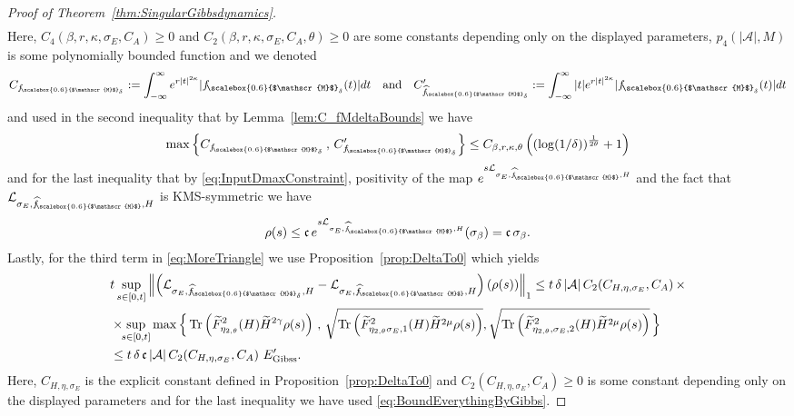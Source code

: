 \documentclass[11pt]{amsart}
\newcommand{\1}{\mathbbm{1}}
\newcommand{\Tr}{\operatorname{Tr}}
\newcommand{\cL}{\mathcal{L}}
\newcommand{\cA}{\mathcal{A}}
\newcommand{\hatfM}{\widehat{f}_{\!\scalebox{0.6}{$\mathscr{M}$}}
}
\newcommand{\hatfMdelta}{\widehat{f}_{\!\scalebox{0.6}{$\mathscr{M}$}_\delta}}
\newcommand{\fMdelta}{f_{\!\scalebox{0.6}{$\mathscr{M}$}_\delta}}
\theoremstyle{plain}
\theoremstyle{definition}
\theoremstyle{remark}
\numberwithin{equation}{section}
\begin{document}
\begin{proof}[Proof of Theorem~\ref{thm:SingularGibbsdynamics}]
\begin{align*}
\end{align*}
Here, $C_4(\beta,r,\kappa,\sigma_E,C_A)\ge 0$ and $C_2(\beta,r,\kappa,\sigma_E,C_A,\theta)\ge 0$ are some constants depending only on the displayed parameters, $p_4(|\mathcal{A}|,M)$ is some polynomially bounded function and we denoted
\begin{align*}
    C_{\fMdelta} := \int_{-\infty}^{\infty} e^{r|t|^{2\kappa}} |\fMdelta(t)| dt\quad\text{and}\quad C'_{\hatfMdelta} := \int_{-\infty}^{\infty} |t|e^{r|t|^{2\kappa}} |\fMdelta(t)| dt
\end{align*}
and used in the second inequality that by Lemma~\ref{lem:C_fMdeltaBounds} we have
\begin{align*}
    \max\left\{C_{\fMdelta}\,,\, C'_{\fMdelta}\right\}\le C_{\beta,r,\kappa,\theta}\left((\log(1/\delta))^{\frac{1}{2\theta}} +1\right)
\end{align*}
 and for the last inequality that by \eqref{eq:InputDmaxConstraint}, positivity of the map $e^{s\cL_{\sigma_E,\hatfM,H}}$ and the fact that $\cL_{\sigma_E,\hatfM,H}$ is KMS-symmetric we have
\begin{align}
\label{eq:BoundEverythingByGibbs}
   \rho(s) \le \mathfrak{c}\, e^{s\cL_{\sigma_E,\hatfM,H}}(\sigma_\beta ) = \mathfrak{c}\,\sigma_\beta. 
\end{align}
Lastly, for the third term in \eqref{eq:MoreTriangle} we use Proposition~\ref{prop:DeltaTo0} which yields
\begin{align*}
&t\sup_{s\in[0,t]}\left\|\left(\cL_{\sigma_E,\hatfMdelta,H}-\cL_{\sigma_E,\hatfM,H}\right)(\rho(s))\right\|_1 \le t\, \delta \,|\cA|\,C_2\!\left(C_{H,\eta,\sigma_E},C_A\right) \times\\&\times\!\!\sup_{s\in[0,t]}\max\Big\{\Tr\left( \widetilde F^2_{\eta_{2,\theta}}(H) \widetilde H^{2\gamma}\rho(s)\right)\,,\, \sqrt{\Tr\left(\widetilde F^2_{\eta_{2,\theta}\sigma_E,1}(H) \widetilde H^{2\mu}\rho(s)\right)}, \sqrt{\Tr\left(\widetilde F^2_{\eta_{2,\theta},\sigma_E,2}(H) \widetilde H^{2\mu}\rho(s)\right)}\,\Big\} \\&\le t\,\delta \,\mathfrak{c}\, |\cA|\,C_2\!\left(C_{H,\eta,\sigma_E},C_A\right) \, E'_{\operatorname{Gibss}}.
\end{align*}
Here, $C_{H,\eta,\sigma_E}$ is the explicit constant defined in Proposition~\ref{prop:DeltaTo0} and
$C_2\!\left(C_{H,\eta,\sigma_E},C_A\right)\ge 0$  is some constant depending only on the displayed parameters and for the last inequality we have used  \eqref{eq:BoundEverythingByGibbs}.


\end{proof}
\end{document}
